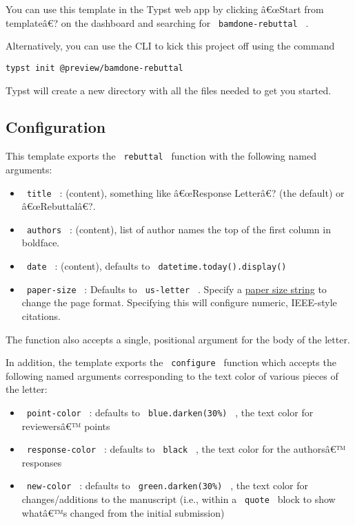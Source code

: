 You can use this template in the Typst web app by clicking â€œStart from
templateâ€? on the dashboard and searching for
\texttt{\ bamdone-rebuttal\ } .

Alternatively, you can use the CLI to kick this project off using the
command

\begin{verbatim}
typst init @preview/bamdone-rebuttal
\end{verbatim}

Typst will create a new directory with all the files needed to get you
started.

\subsection{Configuration}\label{configuration}

This template exports the \texttt{\ rebuttal\ } function with the
following named arguments:

\begin{itemize}
\tightlist
\item
  \texttt{\ title\ } : (content), something like â€œResponse Letterâ€?
  (the default) or â€œRebuttalâ€?.
\item
  \texttt{\ authors\ } : (content), list of author names the top of the
  first column in boldface.
\item
  \texttt{\ date\ } : (content), defaults to
  \texttt{\ datetime.today().display()\ }
\item
  \texttt{\ paper-size\ } : Defaults to \texttt{\ us-letter\ } . Specify
  a
  \href{https://typst.app/docs/reference/layout/page/\#parameters-paper}{paper
  size string} to change the page format. Specifying this will configure
  numeric, IEEE-style citations.
\end{itemize}

The function also accepts a single, positional argument for the body of
the letter.

In addition, the template exports the \texttt{\ configure\ } function
which accepts the following named arguments corresponding to the text
color of various pieces of the letter:

\begin{itemize}
\tightlist
\item
  \texttt{\ point-color\ } : defaults to \texttt{\ blue.darken(30\%)\ }
  , the text color for reviewersâ€™ points
\item
  \texttt{\ response-color\ } : defaults to \texttt{\ black\ } , the
  text color for the authorsâ€™ responses
\item
  \texttt{\ new-color\ } : defaults to \texttt{\ green.darken(30\%)\ } ,
  the text color for changes/additions to the manuscript (i.e., within a
  \texttt{\ quote\ } block to show whatâ€™s changed from the initial
  submission)
\end{itemize}


